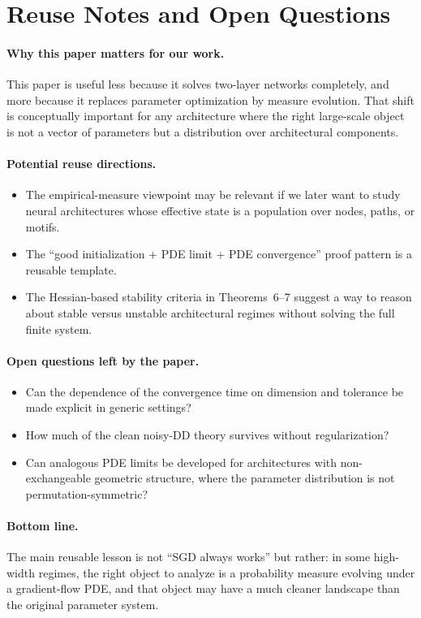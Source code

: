 \section{Reuse Notes and Open Questions}

\paragraph{Why this paper matters for our work.}
This paper is useful less because it solves two-layer networks completely, and more because it replaces parameter optimization by measure evolution. That shift is conceptually important for any architecture where the right large-scale object is not a vector of parameters but a distribution over architectural components.

\paragraph{Potential reuse directions.}
\begin{itemize}[leftmargin=1.5em]
\item The empirical-measure viewpoint may be relevant if we later want to study neural architectures whose effective state is a population over nodes, paths, or motifs.
\item The ``good initialization + PDE limit + PDE convergence'' proof pattern is a reusable template.
\item The Hessian-based stability criteria in Theorems~6--7 suggest a way to reason about stable versus unstable architectural regimes without solving the full finite system.
\end{itemize}

\paragraph{Open questions left by the paper.}
\begin{itemize}[leftmargin=1.5em]
\item Can the dependence of the convergence time on dimension and tolerance be made explicit in generic settings?
\item How much of the clean noisy-DD theory survives without regularization?
\item Can analogous PDE limits be developed for architectures with non-exchangeable geometric structure, where the parameter distribution is not permutation-symmetric?
\end{itemize}

\paragraph{Bottom line.}
The main reusable lesson is not ``SGD always works'' but rather: in some high-width regimes, the right object to analyze is a probability measure evolving under a gradient-flow PDE, and that object may have a much cleaner landscape than the original parameter system.
